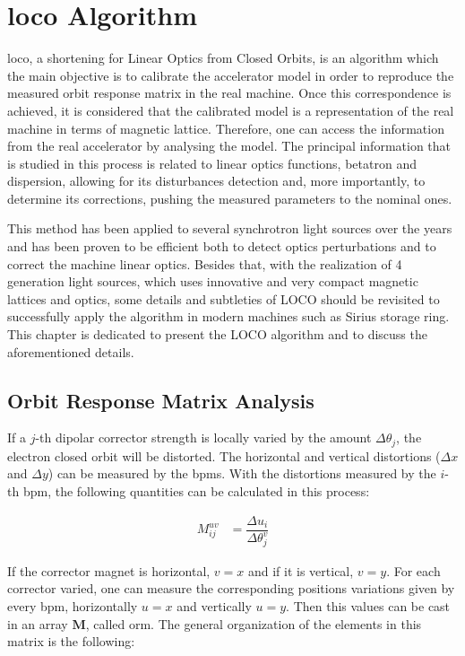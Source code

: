 \chapter{\gls{loco} Algorithm}

\gls{loco}, a shortening for Linear Optics from Closed Orbits, is an algorithm which the main objective is to calibrate the accelerator model in order to reproduce the measured orbit response matrix in the real machine. Once this correspondence is achieved, it is considered that the calibrated model is a representation of the real machine in terms of magnetic lattice. Therefore, one can access the information from the real accelerator by analysing the model. The principal information that is studied in this process is related to linear optics functions, betatron and dispersion, allowing for its disturbances detection and, more importantly, to determine its corrections, pushing the measured parameters to the nominal ones.

This method has been applied to several synchrotron light sources over the years and has been proven to be efficient both to detect optics perturbations and to correct the machine linear optics. Besides that, with the realization of 4 generation light sources, which uses innovative and very compact magnetic lattices and optics, some details and subtleties of LOCO should be revisited to successfully apply the algorithm in modern machines such as Sirius storage ring. This chapter is dedicated to present the LOCO algorithm and to discuss the aforementioned details.

\section{Orbit Response Matrix Analysis}

If a $j$-th dipolar corrector strength is locally varied by the amount $\Delta \theta_j$, the electron closed orbit will be distorted. The horizontal and vertical distortions ($\Delta x$ and $\Delta y$) can be measured by the \gls{bpm}s. With the distortions measured by the $i$-th \gls{bpm}, the following quantities can be calculated in this process:

\begin{align}
    M^{uv}_{ij} &= \dfrac{\Delta u_i}{\Delta \theta_j^v}
\end{align}

If the corrector magnet is horizontal, $v=x$ and if it is vertical, $v=y$. For each corrector varied, one can measure the corresponding positions variations given by every \gls{bpm}, horizontally $u=x$ and vertically $u=y$. Then this values can be cast in an array $\mathbf{M}$, called \gls{orm}. The general organization of the elements in this matrix is the following:

